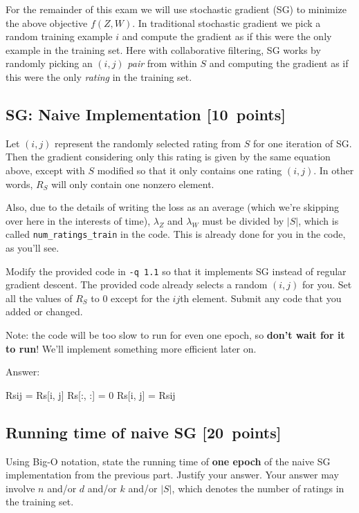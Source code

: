 \documentclass{article}
\newcommand{\blu}[1]{{\textcolor{blu}{#1}}}
\newenvironment{answer}{\par\begingroup\color{gre}Answer: }{\endgroup}
\let\ask\blu
\newcommand\pts[1]{\textcolor{pointscolour}{[#1~points]}}
\begin{document}
For the remainder of this exam we will use stochastic gradient (SG) to minimize the above objective $f(Z,W)$. In traditional stochastic gradient we pick a random training example $i$ and compute the gradient as if this were the only example in the training set. Here with collaborative filtering, SG works by randomly picking an $(i,j)$ \emph{pair} from within $S$ and computing the gradient as if this were the only \emph{rating} in the training set.


\clearpage
\subsection{SG: Naive Implementation \pts{10}}

Let $(i,j)$ represent the randomly selected rating from $S$ for one iteration of SG. Then the gradient considering only this rating is given by the same equation above, except with $S$ modified so that it only contains one rating $(i,j)$. In other words, $R_S$ will only contain one nonzero element.

Also, due to the details of writing the loss as an average (which we're skipping over here in the interests of time), $\lambda_Z$ and $\lambda_W$ must be divided by $|S|$, which is called \texttt{num\_ratings\_train} in the code. This is already done for you in the code, as you'll see.

Modify the provided code in \verb|-q 1.1| so that it implements SG instead of regular gradient descent. The provided code already selects a random $(i,j)$ for you. \ask{Set all the values of $R_S$ to 0 except for the $ij$th element. Submit any code that you added or changed.}

Note: the code will be too slow to run for even one epoch, so \textbf{don't wait for it to run}! We'll implement something more efficient later on.

\begin{answer}

\end{answer}
\begin{python}
Rsij = Rs[i, j]
Rs[:, :] = 0
Rs[i, j] = Rsij
\end{python}


\clearpage
\subsection{Running time of naive SG \pts{20}}

\ask{Using Big-O notation, state the running time of \textbf{one epoch} of the naive SG implementation from the previous part. Justify your answer.} Your answer may involve $n$ and/or $d$ and/or $k$ and/or $|S|$, which denotes the number of ratings in the training set.
\end{document}
